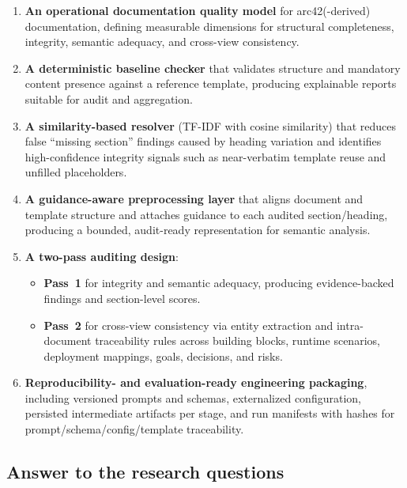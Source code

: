\begin{enumerate}
    \item \textbf{An operational documentation quality model} for arc42(-derived) documentation, defining measurable dimensions for structural completeness, integrity, semantic adequacy, and cross-view consistency.

    \item \textbf{A deterministic baseline checker} that validates structure and mandatory content presence against a reference template, producing explainable reports suitable for audit and aggregation.

    \item \textbf{A similarity-based resolver} (TF-IDF with cosine similarity) that reduces false ``missing section'' findings caused by heading variation and identifies high-confidence integrity signals such as near-verbatim template reuse and unfilled placeholders.

    \item \textbf{A guidance-aware preprocessing layer} that aligns document and template structure and attaches guidance to each audited section/heading, producing a bounded, audit-ready representation for semantic analysis.

    \item \textbf{A two-pass auditing design}:
    \begin{itemize}
        \item \textbf{Pass~1} for integrity and semantic adequacy, producing evidence-backed findings and section-level scores.
        \item \textbf{Pass~2} for cross-view consistency via entity extraction and intra-document traceability rules across building blocks, runtime scenarios, deployment mappings, goals, decisions, and risks.
    \end{itemize}

    \item \textbf{Reproducibility- and evaluation-ready engineering packaging}, including versioned prompts and schemas, externalized configuration, persisted intermediate artifacts per stage, and run manifests with hashes for prompt/schema/config/template traceability.
\end{enumerate}

\subsection{Answer to the research questions}
\label{sec:conclusion_rq_answers}

